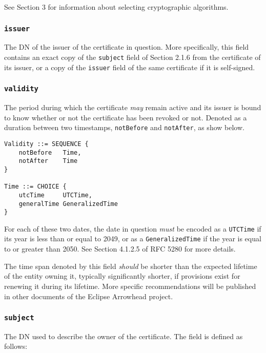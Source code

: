 See Section 3 for information about selecting cryptographic algorithms.

\subsubsection{\texttt{issuer}}

The DN of the issuer of the certificate in question.
More specifically, this field contains an exact copy of the \texttt{subject} field of Section 2.1.6 from the certificate of its issuer, or a copy of the \texttt{issuer} field of the same certificate if it is self-signed.

\subsubsection{\texttt{validity}}

The period during which the certificate \textit{may} remain active and its issuer is bound to know whether or not the certificate has been revoked or not.
Denoted as a duration between two timestamps, \texttt{notBefore} and \texttt{notAfter}, as show below.

\begin{verbatim}
Validity ::= SEQUENCE {
    notBefore   Time,
    notAfter    Time
}

Time ::= CHOICE {
    utcTime     UTCTime,
    generalTime GeneralizedTime
}
\end{verbatim}

For each of these two dates, the date in question \textit{must} be encoded as a \texttt{UTCTime} if its year is less than or equal to 2049, or as a \texttt{GeneralizedTime} if the year is equal to or greater than 2050.
See Section 4.1.2.5 of RFC 5280 for more details.

The time span denoted by this field \textit{should} be shorter than the expected lifetime of the entity owning it, typically significantly shorter, if provisions exist for renewing it during its lifetime.
More specific recommendations will be published in other documents of the Eclipse Arrowhead project.

\subsubsection{\texttt{subject}}

The DN used to describe the owner of the certificate.
The field is defined as follows:

